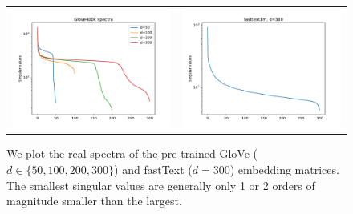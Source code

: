 \begin{figure}
	\centering
	\begin{tabular}{c c}
		\includegraphics[width=0.4\linewidth]{figures/glove400k_spectra.pdf} &	
		\includegraphics[width=0.4\linewidth]{figures/fasttext1m_spectra.pdf}
	\end{tabular}
	\caption{We plot the real spectra of the pre-trained GloVe ($d \in \{50,100,200,300\}$) and fastText ($d=300$) embedding matrices.
	The smallest singular values are generally only 1 or 2 orders of magnitude smaller than the largest.  
	}
	\label{fig:real_spectra}
\end{figure}


